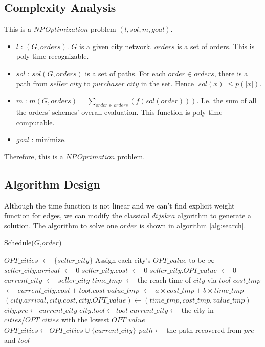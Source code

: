\documentclass[11pt, a4paper]{article} %
\begin{document}
	\subsection{Complexity Analysis}\label{1-CA}
	This is a $NP\,Optimization$ problem $(l,sol,m,goal)$.
	\begin{itemize}
		\item $l$ : $(G,orders)$. $G$ is a given city network. $orders$ is a set of orders. This is poly-time recognizable.
		\item $sol$ : $sol(G,orders)$ is a set of paths. For each $order\in orders$, there is a path from $seller\_city$ to $purchaser\_city$ in the set. Hence $|sol(x)|\leq p(|x|)$.
		\item $m$ : $m(G,orders) = \sum_{order\in orders}(f(sol(order)))$. I.e. the sum of all the orders' schemes' overall evaluation. This function is poly-time computable.
		\item $goal$ : minimize.
	\end{itemize}
	Therefore, this is a $NP\,Oprimation$ problem.
	\subsection{Algorithm Design}
	Although the time function is not linear and we can't find explicit weight function for edges, we can modify the classical $dijskra$ algorithm to generate a solution. The algorithm to solve one $order$ is shown in algorithm \ref{alg:search}.\\
	\begin{algorithm}\label{alg:search}
		\caption{Schedule($G$,$order$)}
		\BlankLine
		$OPT\_cities$ $\leftarrow$ $\{seller\_city\}$\;
		Assign each city's $OPT\_value$ to be $\infty$\;
		$seller\_city.arrival$ $\leftarrow$ 0\;
		$seller\_city.cost$ $\leftarrow$ 0\;
		$seller\_city.OPT\_value$ $\leftarrow$ 0\;
		$current\_city$ $\leftarrow$ $seller\_city$\;
		{
			{
				{
					$time\_tmp$ $\leftarrow$ the reach time of $city$ via $tool$\;
					$cost\_tmp$ $\leftarrow$ $current\_city.cost+ tool.cost$\;
					$value\_tmp$ $\leftarrow$ $a\times cost\_tmp+b\times time\_tmp$\;
					{
						$(city.arrival,city.cost,city.OPT\_value)\leftarrow(time\_tmp,cost\_tmp,value\_tmp)$\;
						$city.pre\leftarrow current\_city$\;
						$city.tool\leftarrow tool$\;
					}
				}
			}
			$current\_city\leftarrow$ the city in $cities/OPT\_cities$ with the lowest $OPT\_value$\;
			$OPT\_cities\leftarrow OPT\_cities\cup \{current\_city\}$\;
		}
		$path\leftarrow$ the path recovered from $pre$ and $tool$\;
		\;
	\end{algorithm}
\end{document}
